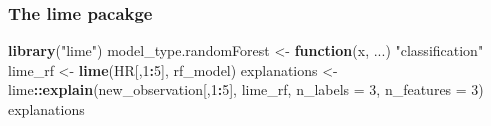 \documentclass[12pt,]{krantz}
\newenvironment{Shaded}{\begin{snugshade}}{\end{snugshade}}
\newcommand{\ControlFlowTok}[1]{\textcolor[rgb]{0.13,0.29,0.53}{\textbf{#1}}}
\newcommand{\DataTypeTok}[1]{\textcolor[rgb]{0.13,0.29,0.53}{#1}}
\newcommand{\DecValTok}[1]{\textcolor[rgb]{0.00,0.00,0.81}{#1}}
\newcommand{\KeywordTok}[1]{\textcolor[rgb]{0.13,0.29,0.53}{\textbf{#1}}}
\newcommand{\NormalTok}[1]{#1}
\newcommand{\OperatorTok}[1]{\textcolor[rgb]{0.81,0.36,0.00}{\textbf{#1}}}
\newcommand{\StringTok}[1]{\textcolor[rgb]{0.31,0.60,0.02}{#1}}
\theoremstyle{definition}
\theoremstyle{definition}
\theoremstyle{definition}
\theoremstyle{remark}
\begin{document}
\hypertarget{the-lime-pacakge}{%
\subsubsection{\texorpdfstring{\textbf{The lime
pacakge}}{The lime pacakge}}\label{the-lime-pacakge}}

\begin{Shaded}
\begin{Highlighting}[]
\KeywordTok{library}\NormalTok{(}\StringTok{"lime"}\NormalTok{)}
\NormalTok{model_type.randomForest <-}\StringTok{ }\ControlFlowTok{function}\NormalTok{(x, ...) }\StringTok{"classification"}
\NormalTok{lime_rf <-}\StringTok{ }\KeywordTok{lime}\NormalTok{(HR[,}\DecValTok{1}\OperatorTok{:}\DecValTok{5}\NormalTok{], rf_model)}
\NormalTok{explanations <-}\StringTok{ }\NormalTok{lime}\OperatorTok{::}\KeywordTok{explain}\NormalTok{(new_observation[,}\DecValTok{1}\OperatorTok{:}\DecValTok{5}\NormalTok{], lime_rf, }\DataTypeTok{n_labels =} \DecValTok{3}\NormalTok{, }\DataTypeTok{n_features =} \DecValTok{3}\NormalTok{)}
\NormalTok{explanations}
\end{Highlighting}
\end{Shaded}
\end{document}
